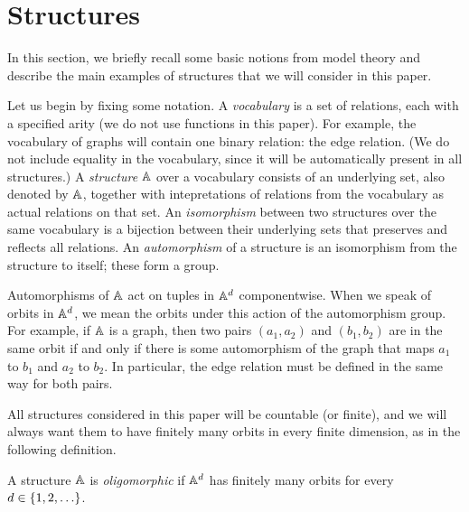 \section{Structures}\label{sec:structures}

In this section, we briefly recall some basic notions from model theory and describe the main examples of structures that we will consider in this paper.

Let us begin by fixing some notation.
A \emph{vocabulary} is a set of relations, each with a specified arity (we do not use functions in this paper). For example, the vocabulary of graphs will contain one binary relation: the edge relation. (We do not include equality in the vocabulary, since it will be automatically present in all structures.) A \emph{structure} $\mathbb{A}$ over a vocabulary consists of an underlying set, also denoted by $\mathbb{A}$, together with intepretations of relations from the vocabulary as actual relations on that set. An \emph{isomorphism} between two structures over the same vocabulary is a bijection between their underlying sets that preserves and reflects all relations. An \emph{automorphism} of a structure is an isomorphism from the structure to itself; these form a group. 

Automorphisms  of $\mathbb{A}$ act on  tuples in $\mathbb{A}^d$ componentwise.  When we speak of orbits in $\mathbb{A}^d$, we mean the orbits under this action of the automorphism group. For example, if $\mathbb{A}$ is a graph, then two pairs $(a_1,a_2)$ and $(b_1,b_2)$ are in the same orbit if and only if there is some automorphism of the graph that maps $a_1$ to $b_1$ and $a_2$ to $b_2$. In particular, the edge relation must be defined in the same way for both pairs.

All structures considered in this paper will be countable (or finite), and we will always want them to have finitely many orbits in every finite dimension, as  in the following definition.

\begin{definition}\label{def:oligomorphic-structure}
    A structure $\mathbb{A}$ is \emph{oligomorphic} if $\mathbb{A}^d$ has finitely many orbits  for every $d \in \{1,2,\ldots\}$.
\end{definition}

